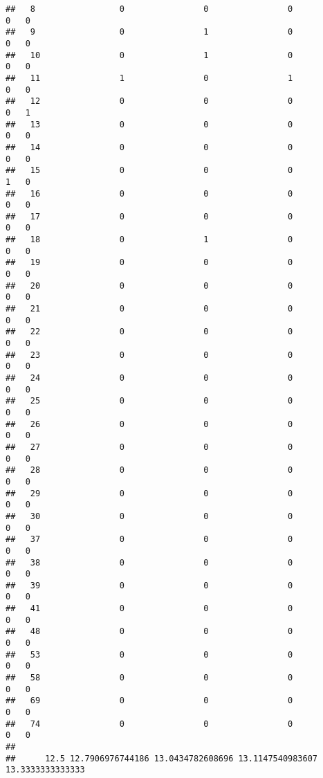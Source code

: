 \documentclass[]{article}
\begin{document}
\begin{verbatim}
##   8                 0                0                0               0   0
##   9                 0                1                0               0   0
##   10                0                1                0               0   0
##   11                1                0                1               0   0
##   12                0                0                0               0   1
##   13                0                0                0               0   0
##   14                0                0                0               0   0
##   15                0                0                0               1   0
##   16                0                0                0               0   0
##   17                0                0                0               0   0
##   18                0                1                0               0   0
##   19                0                0                0               0   0
##   20                0                0                0               0   0
##   21                0                0                0               0   0
##   22                0                0                0               0   0
##   23                0                0                0               0   0
##   24                0                0                0               0   0
##   25                0                0                0               0   0
##   26                0                0                0               0   0
##   27                0                0                0               0   0
##   28                0                0                0               0   0
##   29                0                0                0               0   0
##   30                0                0                0               0   0
##   37                0                0                0               0   0
##   38                0                0                0               0   0
##   39                0                0                0               0   0
##   41                0                0                0               0   0
##   48                0                0                0               0   0
##   53                0                0                0               0   0
##   58                0                0                0               0   0
##   69                0                0                0               0   0
##   74                0                0                0               0   0
##     
##      12.5 12.7906976744186 13.0434782608696 13.1147540983607 13.3333333333333

\end{verbatim}
\end{document}
